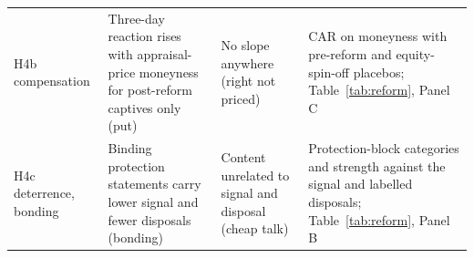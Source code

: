 \begin{table}[htbp]
{\begin{tabular}{>{\raggedright\arraybackslash}p{1.5cm}>{\raggedright\arraybackslash}p{4.1cm}>{\raggedright\arraybackslash}p{3.7cm}>{\raggedright\arraybackslash}p{4.4cm}}
H4b compensation & Three-day reaction rises with appraisal-price moneyness for post-reform captives only (put) & No slope anywhere (right not priced) & CAR on moneyness with pre-reform and equity-spin-off placebos; Table~\ref{tab:reform}, Panel C \\
H4c deterrence, bonding & Binding protection statements carry lower signal and fewer disposals (bonding) & Content unrelated to signal and disposal (cheap talk) & Protection-block categories and strength against the signal and labelled disposals; Table~\ref{tab:reform}, Panel B \\
\bottomrule
\end{tabular}}
\end{table}
